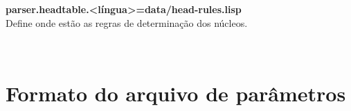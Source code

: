 \textbf{parser.headtable.<língua>=data/head-rules.lisp}\\
Define onde estão as regras de determinação dos núcleos.

\HRule \\





\section{Formato do arquivo de parâmetros}
\label{sec:bikel_formato_aqrquivo}


